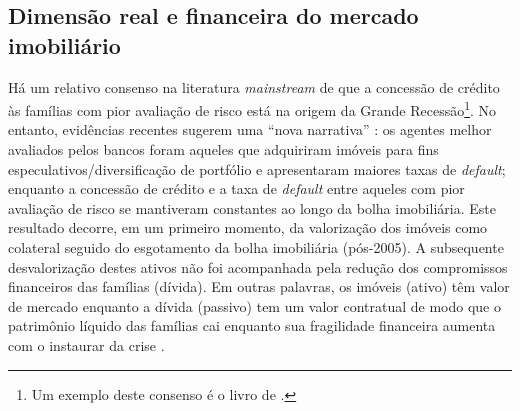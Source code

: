 \subsection{Dimensão real e financeira do mercado imobiliário}

Há um relativo consenso na literatura \textit{mainstream} de que a concessão de crédito às famílias com pior avaliação de risco está na origem da Grande Recessão\footnote{
Um exemplo deste consenso é o livro de \textcite{mian_consequences_2009}.
}. 
No entanto, evidências recentes sugerem uma ``nova narrativa'' \cite{albanesi_credit_2017}: os agentes melhor avaliados pelos bancos foram aqueles que adquiriram imóveis para fins especulativos/diversificação de portfólio e apresentaram maiores taxas de \textit{default}; enquanto a concessão de crédito e a taxa de \textit{default} entre aqueles com pior avaliação de risco se mantiveram constantes ao longo da bolha imobiliária.
Este resultado decorre, em um primeiro momento, da valorização dos imóveis como colateral seguido do esgotamento da bolha imobiliária (pós-2005).
A subsequente desvalorização destes ativos não foi acompanhada pela redução dos compromissos financeiros das famílias (dívida). 
Em outras palavras, os imóveis (ativo) têm valor de mercado enquanto a dívida (passivo) tem um valor contratual de modo que o patrimônio líquido das famílias cai  enquanto sua fragilidade financeira aumenta com o instaurar da crise \cites{albanesi_credit_2017}{jorda_rate_2019}.


